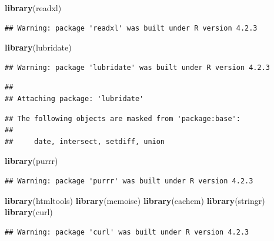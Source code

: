 \documentclass[
]{article}
\newenvironment{Shaded}{\begin{snugshade}}{\end{snugshade}}
\newcommand{\FunctionTok}[1]{\textcolor[rgb]{0.13,0.29,0.53}{\textbf{#1}}}
\newcommand{\NormalTok}[1]{#1}
\begin{document}
\begin{Shaded}
\begin{Highlighting}[]
\FunctionTok{library}\NormalTok{(readxl)}
\end{Highlighting}
\end{Shaded}

\begin{verbatim}
## Warning: package 'readxl' was built under R version 4.2.3
\end{verbatim}

\begin{Shaded}
\begin{Highlighting}[]
\FunctionTok{library}\NormalTok{(lubridate)}
\end{Highlighting}
\end{Shaded}

\begin{verbatim}
## Warning: package 'lubridate' was built under R version 4.2.3
\end{verbatim}

\begin{verbatim}
## 
## Attaching package: 'lubridate'
\end{verbatim}

\begin{verbatim}
## The following objects are masked from 'package:base':
## 
##     date, intersect, setdiff, union
\end{verbatim}

\begin{Shaded}
\begin{Highlighting}[]
\FunctionTok{library}\NormalTok{(purrr)}
\end{Highlighting}
\end{Shaded}

\begin{verbatim}
## Warning: package 'purrr' was built under R version 4.2.3
\end{verbatim}

\begin{Shaded}
\begin{Highlighting}[]
\FunctionTok{library}\NormalTok{(htmltools)}
\FunctionTok{library}\NormalTok{(memoise)}
\FunctionTok{library}\NormalTok{(cachem)}
\FunctionTok{library}\NormalTok{(stringr)}
\FunctionTok{library}\NormalTok{(curl)}
\end{Highlighting}
\end{Shaded}

\begin{verbatim}
## Warning: package 'curl' was built under R version 4.2.3
\end{verbatim}
\end{document}
